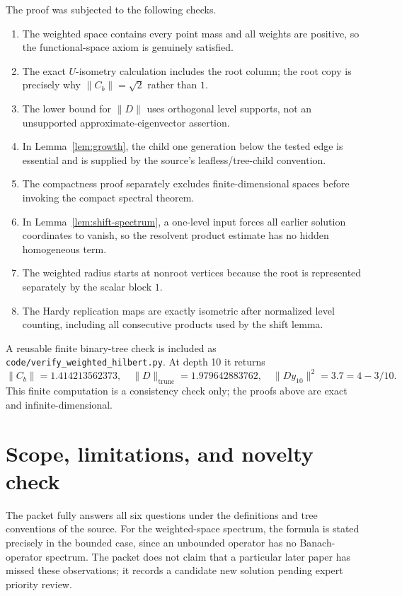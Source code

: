 \documentclass[11pt]{article}
\newcommand{\Cb}{C_b}
\begin{document}
The proof was subjected to the following checks.
\begin{enumerate}
  \item The weighted space contains every point mass and all weights are
  positive, so the functional-space axiom is genuinely satisfied.
  \item The exact $U$-isometry calculation includes the root column; the root
  copy is precisely why $\|\Cb\|=\sqrt2$ rather than $1$.
  \item The lower bound for $\|D\|$ uses orthogonal level supports, not an
  unsupported approximate-eigenvector assertion.
  \item In Lemma~\ref{lem:growth}, the child one generation below the tested
  edge is essential and is supplied by the source's leafless/tree-child
  convention.
  \item The compactness proof separately excludes finite-dimensional spaces
  before invoking the compact spectral theorem.
  \item In Lemma~\ref{lem:shift-spectrum}, a one-level input forces all
  earlier solution coordinates to vanish, so the resolvent product estimate
  has no hidden homogeneous term.
  \item The weighted radius starts at nonroot vertices because the root is
  represented separately by the scalar block $1$.
  \item The Hardy replication maps are exactly isometric after normalized
  level counting, including all consecutive products used by the shift lemma.
\end{enumerate}

A reusable finite binary-tree check is included as
\texttt{code/verify\_weighted\_hilbert.py}. At depth 10 it returns
\[
 \|\Cb\|=1.414213562373,
 \quad \|D\|_{\mathrm{trunc}}=1.979642883762,
 \quad \|Dy_{10}\|^2=3.7=4-3/10.
\]
This finite computation is a consistency check only; the proofs above are
exact and infinite-dimensional.

\section{Scope, limitations, and novelty check}

The packet fully answers all six questions under the definitions and tree
conventions of the source. For the weighted-space spectrum, the formula is
stated precisely in the bounded case, since an unbounded operator has no
Banach-operator spectrum. The packet does not claim that a particular later
paper has missed these observations; it records a candidate new solution
pending expert priority review.
\end{document}
